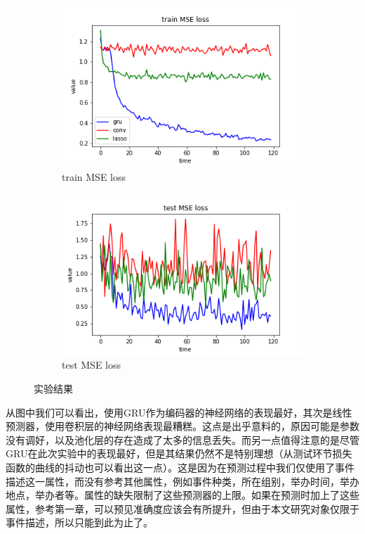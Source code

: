 \documentclass[12pt]{template}
\begin{document}
\begin{figure}[htb]
	\centering
	\begin{subfigure}{.4\textwidth}
		\includegraphics[width=\textwidth]{trainloss.png}
		\caption{train MSE loss}
	\end{subfigure}
	\begin{subfigure}{.4\textwidth}
		\includegraphics[width=\textwidth]{testloss.png}
		\caption{test MSE loss}
	\end{subfigure}
    \caption{实验结果}
    \label{f24}
\end{figure} 

从图中我们可以看出，使用GRU作为编码器的神经网络的表现最好，其次是线性预测器，使用卷积层的神经网络表现最糟糕。这点是出乎意料的，原因可能是参数没有调好，以及池化层的存在造成了太多的信息丢失。而另一点值得注意的是尽管GRU在此次实验中的表现最好，但是其结果仍然不是特别理想（从测试环节损失函数的曲线的抖动也可以看出这一点）。这是因为在预测过程中我们仅使用了事件描述这一属性，而没有参考其他属性，例如事件种类，所在组别，举办时间，举办地点，举办者等。属性的缺失限制了这些预测器的上限。如果在预测时加上了这些属性，参考第一章，可以预见准确度应该会有所提升，但由于本文研究对象仅限于事件描述，所以只能到此为止了。 
\end{document}
